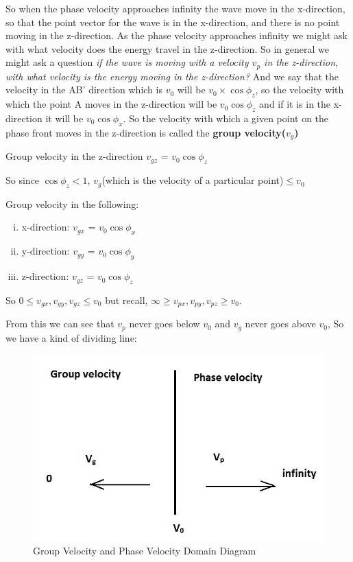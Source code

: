 So when the phase velocity approaches infinity the wave move in the x-direction, so that the point vector for the wave is in the x-direction, and there is no point moving in the z-direction.
As the phase velocity approaches infinity we might ask with what velocity does the energy travel in the z-direction.
So in general we might ask a question \emph{if the wave is moving with a velocity $v_p$ in the z-direction, with what velocity is the energy moving in the z-direction?}
And we say that the velocity in the AB' direction which is $v_0$ will be $v_0\times\cos\phi_{z}$, so the velocity with which the point A moves in the z-direction will be $v_0\cos\phi_{z}$ and if it is in the x-direction it will be $v_0\cos\phi_{x}$. So the velocity with which a given point on the phase front moves in the z-direction is called the \textbf{group velocity($v_g$)}

\begin{center}
Group velocity in the z-direction
$v_{gz}$ = $v_0\cos\phi_{z}$
\end{center}
So since $\cos\phi_{z} < 1$, $v_g$(which is the velocity of a particular point)$\leq v_0$

Group velocity in the following:
\begin{enumerate}[(i)]
\item x-direction:	$v_{gx}$ = $v_0\cos\phi_{x}$
\item y-direction: 	$v_{gy}$ = $v_0\cos\phi_{y}$
\item z-direction:	$v_{gz}$ = $v_0\cos\phi_{z}$
\end{enumerate}

So $0\leq v_{gx},v_{gy},v_{gz} \leq v_0$ but recall, $\infty\geq v_{px},v_{py},v_{pz} \geq v_0$.

From this we can see that $v_p$ never goes below $v_0$ and $v_g$ never goes above $v_0$,
So we have a kind of dividing line:
\begin{figure}[h]
\centering
\includegraphics[width=.8\linewidth]{graphics/img3}
\caption{Group Velocity and Phase Velocity Domain Diagram}
\end{figure}

